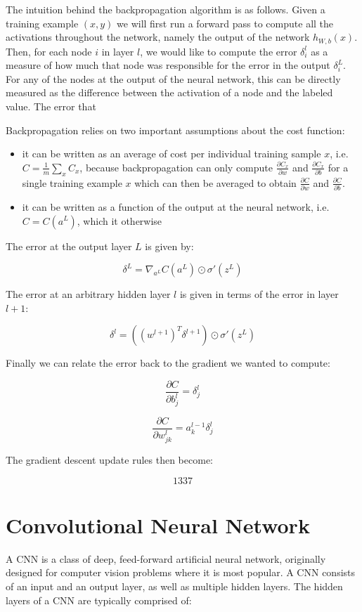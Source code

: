 The intuition behind the backpropagation algorithm is as follows. Given a training example $(x, y)$ we will first run a forward pass to compute all the activations throughout the network, namely the output of the network $h_{W,b}(x)$. Then, for each node $i$ in layer $l$, we would like to compute the error $\delta^{l}_i$ as a measure of how much that node was responsible for the error in the output $\delta^{L}_i$. For any of the nodes at the output of the neural network, this can be directly measured as the difference between the activation of a node and the labeled value.
The error that

Backpropagation relies on two important assumptions about the cost function:

\begin{itemize}
    \item it can be written as an average of cost per individual training sample $x$, i.e. $C = \frac{1}{m} \sum_x C_x$, because backpropagation can only compute $\frac{\partial C_x}{\partial w}$  and $\frac{\partial C_x}{\partial b}$ for a single training example $x$ which can then be averaged to obtain $\frac{\partial C}{\partial w}$  and $\frac{\partial C}{\partial b}$.
    \item it can be written as a function of the output at the neural network, i.e. $C = C(a^{L})$, which it otherwise
\end{itemize}

The error at the output layer $L$ is given by:

$$
\delta^L = \nabla_{a^L} C(a^L) \odot \sigma'(z^L)
$$

The error at an arbitrary hidden layer $l$ is given in terms of the error in layer $l+1$:

$$
\delta^l = ((w^{l+1})^T \delta^{l+1}) \odot \sigma'(z^L)
$$

Finally we can relate the error back to the gradient we wanted to compute:

$$
\frac{\partial C}{\partial b^l_j} = \delta^l_j
$$

$$
\frac{\partial C}{\partial w^l_{jk}} = a^{l-1}_k \delta^l_j
$$

The gradient descent update rules then become:

$$
1337
$$

\section{Convolutional Neural Network}

A \ac{CNN} is a class of deep, feed-forward artificial neural network, originally designed for computer vision problems where it is most popular. A \ac{CNN} consists of an input and an output layer, as well as multiple hidden layers. The hidden layers of a \ac{CNN} are typically comprised of:

